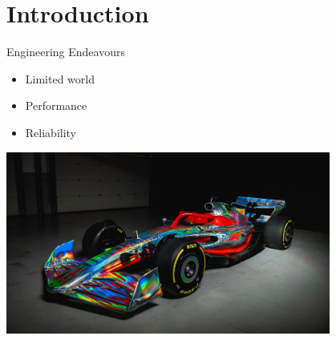 \section{Introduction}
\begin{frame}{Engineering Endeavours}
\begin{minipage}{0.45\textwidth}
  \begin{itemize}
    \item Limited world 
    \item Performance 
    \item Reliability 
  \end{itemize}
\end{minipage}%
\hspace{1cm}
\begin{minipage}{0.45\textwidth}
    \centering
    \includegraphics[width=0.8\textwidth]{Figures/intro/f1.jpg}
\end{minipage}
\end{frame}


